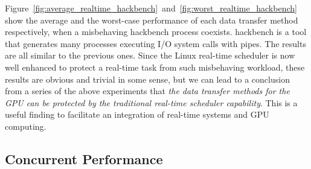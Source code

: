 Figure~\ref{fig:average_realtime_hackbench}~and~\ref{fig:worst_realtime_hackbench}
show the average and the worst-case performance of each data transfer
method respectively, when a misbehaving \textsf{hackbench} process coexists.
\textsf{hackbench} is a tool that generates many processes executing I/O
system calls with pipes.
The results are all similar to the previous ones.
Since the Linux real-time scheduler is now well enhanced to protect a
real-time task from such misbehaving workload, these results are obvious
and trivial in some sense, but we can lead to a conclusion from a series
of the above experiments that \textit{the data transfer methods for the
GPU can be protected by the traditional real-time scheduler capability}.
This is a useful finding to facilitate an integration of real-time
systems and GPU computing.

\subsection{Concurrent Performance}


